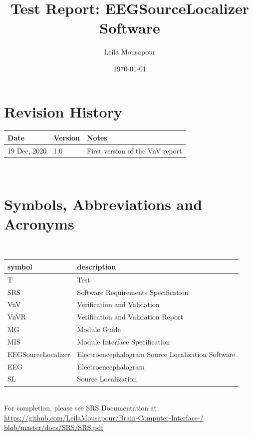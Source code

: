 \documentclass[12pt, titlepage]{article}
\renewcommand{\progname}{EEGSourceLocalizer}
\begin{document}
\title{Test Report: \progname{} Software} 
\author{Leila Mousapour}
\date{\today}
	
\maketitle


\section{Revision History}

\begin{tabularx}{\textwidth}{p{3cm}p{2cm}X}
\toprule {\bf Date} & {\bf Version} & {\bf Notes}\\
\midrule
19 Dec, 2020 & 1.0 & First version of the VnV report\\
\bottomrule
\end{tabularx}

~\newpage

\section{Symbols, Abbreviations and Acronyms}


~\newline
\renewcommand{\arraystretch}{1.2}
\begin{tabular}{l l} 
\toprule		
\textbf{symbol} & \textbf{description}\\
\midrule 
T& Test\\
SRS & Software Requirements Specification\\
VnV & Verification and Validation\\
VnVR & Verification and Validation Report\\
MG& Module Guide\\
MIS& Module Interface Specification\\
EEGSourceLocalizer & Electroencephalogram Source Localization Software\\ 
EEG & Electroencephalogram \\
SL & Source Localization \\
\bottomrule
\end{tabular}\\

For completion, please see SRS Documentation at \url{https://github.com/LeilaMousapour/Brain-Computer-Interface-/ blob/master/docs/SRS/SRS.pdf}
\end{document}

